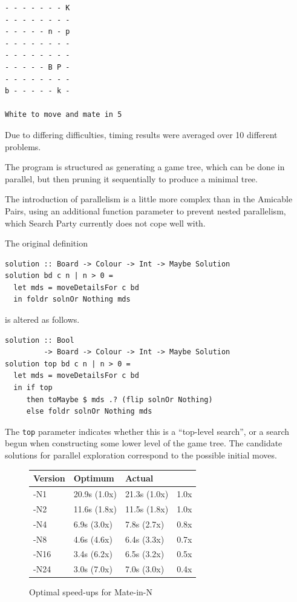 \begin{verbatim}
- - - - - - - K 
- - - - - - - - 
- - - - - n - p 
- - - - - - - - 
- - - - - - - - 
- - - - - B P - 
- - - - - - - - 
b - - - - - k - 

White to move and mate in 5
\end{verbatim}

Due to differing difficulties, timing results were averaged over 10
different problems.

The program is structured as generating a game tree, which can be done
in parallel, but then pruning it sequentially to produce a minimal
tree.

The introduction of parallelism is a little more complex than in the
Amicable Pairs, using an additional function parameter to prevent
nested parallelism, which Search Party currently does not cope well
with.

\vspace{1cm}
The original definition

\begin{verbatim}
solution :: Board -> Colour -> Int -> Maybe Solution
solution bd c n | n > 0 = 
  let mds = moveDetailsFor c bd
  in foldr solnOr Nothing mds
\end{verbatim}

\noindent is altered as follows.

\begin{verbatim}
solution :: Bool
         -> Board -> Colour -> Int -> Maybe Solution
solution top bd c n | n > 0 = 
  let mds = moveDetailsFor c bd
  in if top
     then toMaybe $ mds .? (flip solnOr Nothing)
     else foldr solnOr Nothing mds
\end{verbatim}

The \verb|top| parameter indicates whether this is a ``top-level
search'', or a search begun when constructing some lower level of the
game tree. The candidate solutions for parallel exploration correspond
to the possible initial moves.

\begin{figure}[t]
  \centering
  \begin{tabularx}{\linewidth}{|X|X|X|X|}
    \hline \textbf{Version} & \textbf{Optimum} & \textbf{Actual} & \\
    \hline -N1  & 20.9s (1.0x) & 21.3s (1.0x) & 1.0x \\
           -N2  & 11.6s (1.8x) & 11.5s (1.8x) & 1.0x \\
           -N4  & 6.9s (3.0x)  & 7.8s (2.7x)  & 0.8x \\
           -N8  & 4.6s (4.6x)  & 6.4s (3.3x)  & 0.7x \\
           -N16 & 3.4s (6.2x)  & 6.5s (3.2x)  & 0.5x \\
           -N24 & 3.0s (7.0x)  & 7.0s (3.0x)  & 0.4x \\
    \hline
  \end{tabularx}
  \caption{Optimal speed-ups for Mate-in-N}
  \label{fig:examples-mate-amdahl}
\end{figure}

